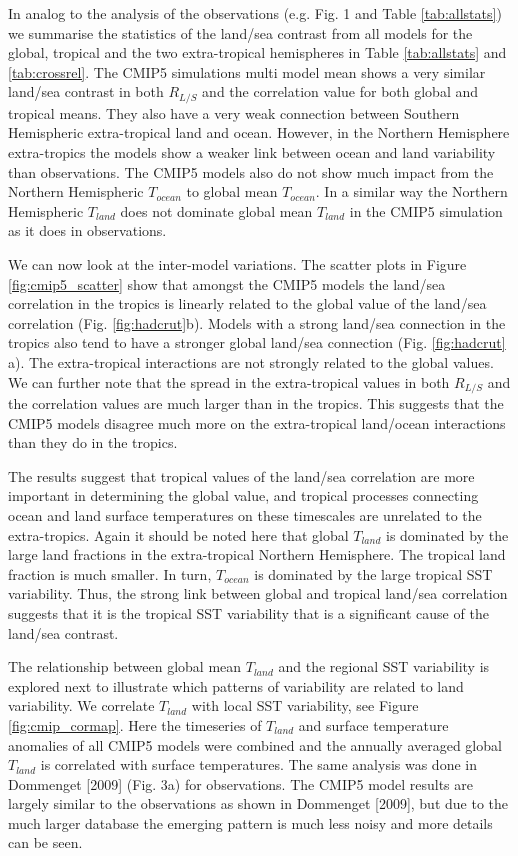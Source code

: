 In analog to the analysis of the observations (e.g. Fig. 1 and Table 
\ref{tab:allstats}) we summarise the statistics of the land/sea contrast from 
all models for the global, tropical and the two extra-tropical hemispheres in 
Table \ref{tab:allstats} and \ref{tab:crossrel}. The CMIP5 simulations multi 
model mean shows a very similar land/sea contrast in both $R_{L/S}$ and the 
correlation value for both global and tropical means. They also have a very weak 
connection between Southern Hemispheric extra-tropical land and ocean. However, 
in the Northern Hemisphere extra-tropics the models show a weaker link between 
ocean and land variability than observations. The CMIP5 models also do not show 
much impact from the Northern Hemispheric $T_{ocean}$ to global mean 
$T_{ocean}$. In a similar way the Northern Hemispheric $T_{land}$ does not 
dominate global mean $T_{land}$ in the CMIP5 simulation as it does in 
observations.

We can now look at the inter-model variations. The scatter plots in Figure 
\ref{fig:cmip5_scatter} show that amongst the CMIP5 models the land/sea 
correlation in the tropics is linearly related to the global value of the 
land/sea correlation (Fig. \ref{fig:hadcrut}b). Models with a strong land/sea 
connection in the tropics also tend to have a stronger global land/sea 
connection (Fig.  \ref{fig:hadcrut} a).  The extra-tropical interactions are not 
strongly related to the global values. We can further note that the spread in 
the extra-tropical values in both $R_{L/S}$ and the correlation values are much 
larger than in the tropics.  This suggests that the CMIP5 models disagree much 
more on the extra-tropical land/ocean interactions than they do in the tropics. 

The results suggest that tropical values of the land/sea correlation are more 
important in determining the global value, and tropical processes connecting 
ocean and land surface temperatures on these timescales are unrelated to the 
extra-tropics.  Again it should be noted here that global $T_{land}$ is 
dominated by the large land fractions in the extra-tropical Northern Hemisphere.  
The tropical land fraction is much smaller.  In turn, $T_{ocean}$ is dominated 
by the large tropical SST variability. Thus, the strong link between global and 
tropical land/sea correlation suggests that it is the tropical SST variability 
that is a significant cause of the land/sea contrast.

The relationship between global mean $T_{land}$ and the regional SST variability 
is explored next to illustrate which patterns of variability are related to land 
variability. We correlate $T_{land}$ with local SST variability, see Figure 
\ref{fig:cmip_cormap}. Here the timeseries of $T_{land}$ and surface temperature 
anomalies of all CMIP5 models were combined and the annually averaged global 
$T_{land}$ is correlated with surface temperatures. The same analysis was done 
in Dommenget [2009] (Fig. 3a) for observations.  The CMIP5 model results are 
largely similar to the observations as shown in Dommenget [2009], but due to the 
much larger database the emerging pattern is much less noisy and more details 
can be seen.

